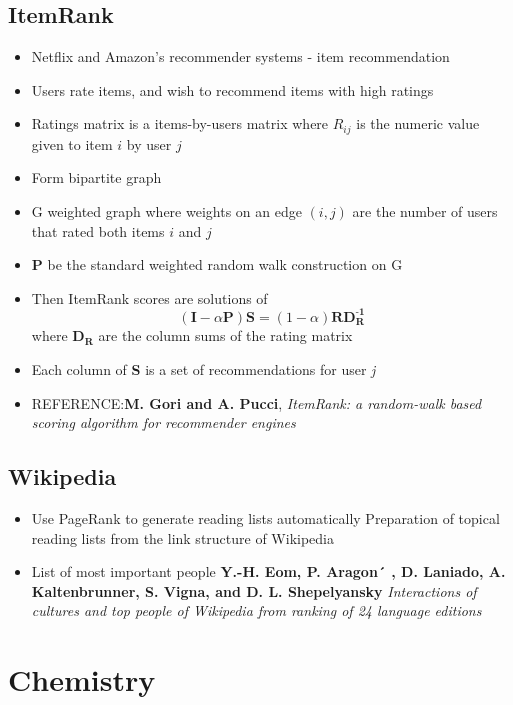 \documentclass[11pt]{report}
\begin{document}
\section{ItemRank}
\begin{itemize}
\item Netflix and Amazon's recommender systems - item recommendation
\item Users rate items, and wish to recommend items with high ratings
\item Ratings matrix is a items-by-users matrix where $R_{ij}$ is the numeric value given to item $i$ by user $j$
\item Form bipartite graph
\item G weighted graph where weights on an edge $(i,j)$ are the number of users that rated both items $i$ and $j$
\item \textbf{P} be the standard weighted random walk construction on G
\item Then ItemRank scores are solutions of \begin{equation}
(\textbf{I} -\alpha\textbf{P}) \textbf{S}= (1-\alpha)\textbf{RD}_\textbf{R}^{\textbf{-1}}
\end{equation} 
where $\textbf{D}_\textbf{R}$ are the column sums of the rating matrix
\item Each column of \textbf{S} is a set of recommendations for user \textit{j}
\item REFERENCE:\textbf{M. Gori and A. Pucci}, \textit{ItemRank: a random-walk based scoring algorithm for recommender engines}
\end{itemize}
\section{Wikipedia}
\begin{itemize}
\item Use PageRank to generate reading lists automatically Preparation of topical reading lists from the link structure of Wikipedia
\item List of most important people \textbf{Y.-H. Eom, P. Aragon´ , D. Laniado, A. Kaltenbrunner, S. Vigna, and D. L. Shepelyansky} \textit{Interactions of cultures and top people of Wikipedia from ranking of 24 language editions}
\end{itemize}
\chapter{Chemistry}
\end{document}
